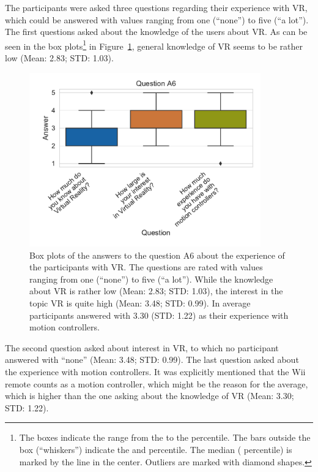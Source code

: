 The participants were asked three questions regarding their experience with \gls{VR}, which could be answered with values ranging from one (\enquote{none}) to five (\enquote{a lot}). The first questions asked about the knowledge of the users about \gls{VR}. As can be seen in the box plots\footnote{The boxes indicate the range from the  to the  percentile. The bars outside the box (\enquote{whiskers}) indicate the  and  percentile. The median ( percentile) is marked by the line in the center. Outliers are marked with diamond shapes.} in Figure~\ref{fig:res-demo-q9}, general knowledge of \gls{VR} seems to be rather low (Mean: 2.83; \gls{STD}: 1.03).

\begin{figure}[H]
	\centering
	\includegraphics[width=10cm]{figures/evaluation/res_demo_q9.pdf}
	\caption[VR experience of the participants]{Box plots of the answers to the question A6 about the experience of the participants with \gls{VR}. The questions are rated with values ranging from one (\enquote{none}) to five (\enquote{a lot}). While the knowledge about \gls{VR} is rather low (Mean: 2.83; \gls{STD}: 1.03), the interest in the topic \gls{VR} is quite high (Mean: 3.48; \gls{STD}: 0.99). In average participants answered with 3.30 (\gls{STD}: 1.22) as their experience with motion controllers.}\label{fig:res-demo-q9}
\end{figure}

The second question asked about interest in \gls{VR}, to which no participant answered with \enquote{none} (Mean: 3.48; \gls{STD}: 0.99). The last question asked about the experience with motion controllers. It was explicitly mentioned that the Wii remote counts as a motion controller, which might be the reason for the average, which is higher than the one asking about the knowledge of \gls{VR} (Mean: 3.30; \gls{STD}: 1.22).


